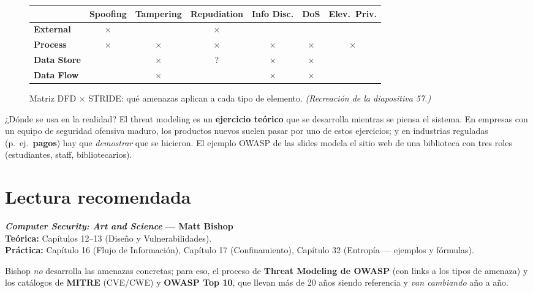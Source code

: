 \documentclass[11pt,a4paper]{article}
\begin{document}
\begin{figure}[h]
\centering
\renewcommand{\arraystretch}{1.25}
\begin{tabular}{>{\bfseries}l cccccc}
\toprule
 & \footnotesize Spoofing & \footnotesize Tampering & \footnotesize Repudiation &
  \footnotesize Info Disc. & \footnotesize DoS & \footnotesize Elev.\ Priv.\\
\midrule
External   & $\times$ &          & $\times$ &          &          &          \\
Process    & $\times$ & $\times$ & $\times$ & $\times$ & $\times$ & $\times$ \\
Data Store &          & $\times$ & ?        & $\times$ & $\times$ &          \\
Data Flow  &          & $\times$ &          & $\times$ & $\times$ &          \\
\bottomrule
\end{tabular}
\caption{Matriz DFD $\times$ STRIDE: qué amenazas aplican a cada tipo de elemento.
\textit{(Recreación de la diapositiva 57.)}}
\end{figure}

\begin{practbox}{¿Dónde se usa en la realidad?}
El threat modeling es un \textbf{ejercicio teórico} que se desarrolla mientras se piensa el
sistema. En empresas con un equipo de seguridad ofensiva maduro, los productos nuevos suelen
pasar por uno de estos ejercicios; y en industrias reguladas (p.\ ej.\ \textbf{pagos}) hay que
\emph{demostrar} que se hicieron. El ejemplo OWASP de las slides modela el sitio web de una
biblioteca con tres roles (estudiantes, staff, bibliotecarios).
\end{practbox}

\section*{Lectura recomendada}
\begin{center}
\begin{tcolorbox}[enhanced,colback=itbaBlue!20,colframe=itbaCyanDark,boxrule=1pt,
  arc=3pt,width=0.9\textwidth,halign=center]
\large\textbf{\emph{Computer Security: Art and Science} — Matt Bishop}\\[6pt]
\normalsize
\textbf{Teórica:} Capítulos 12--13 (Diseño y Vulnerabilidades).\\[3pt]
\textbf{Práctica:} Capítulo 16 (Flujo de Información), Capítulo 17 (Confinamiento),
Capítulo 32 (Entropía — ejemplos y fórmulas).
\end{tcolorbox}
\end{center}
\noindent Bishop \emph{no} desarrolla las amenazas concretas; para eso, el proceso de
\textbf{Threat Modeling de OWASP} (con links a los tipos de amenaza) y los catálogos de
\textbf{MITRE} (CVE/CWE) y \textbf{OWASP Top 10}, que llevan más de 20 años siendo referencia y
\emph{van cambiando} año a año.
\end{document}
